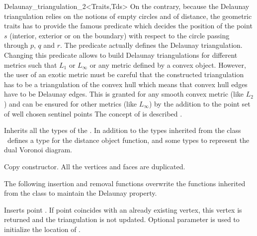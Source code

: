 \begin{ccRefClass}{Delaunay_triangulation_2<Traits,Tds>}
On the contrary, because the
Delaunay triangulation relies on the notions of 
empty circles and of distance, the geometric traits
 has to provide the famous  predicate
which decides the position of  the point $s$ (interior, exterior
or on the boundary) with respect to the circle
passing through $p$, $q$ and $r$. The 
predicate actually defines the Delaunay triangulation.
Changing this predicate 
allows to build Delaunay triangulations for different metrics
such that $L_1$ or $L_{\infty}$ or any metric defined by a
convex object. However, the user of an exotic metric
must be careful that the constructed triangulation 
has to be a triangulation of the convex hull
which means that convex hull edges have to be Delaunay edges.
This is granted for any smooth convex metric (like $L_2$)
and can be ensured for other metrics (like  $L_{\infty}$)
by the addition to the point set of well chosen sentinel points
The concept of  is  described
.



\ccInheritsFrom


\ccTypes
Inherits all the types of the .
In addition to the types inherited from 
the class \ccClassTemplateName\
defines a type for the distance object function, and 
some types to
represent the dual Voronoi diagram.


\ccGlue
{}



\ccCreation
{}  %


{Copy constructor. All the vertices and faces are duplicated.}


The following insertion and removal  functions overwrite
the functions inherited from the class
 to maintain the Delaunay property.




{Inserts  point .
If point \ccc{p} coincides with an already existing vertex, this 
vertex is returned and the triangulation is not updated.
Optional parameter  is used to initialize the location of .
}


\end{ccRefClass}
